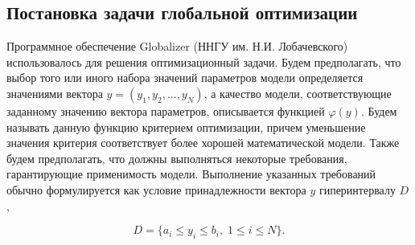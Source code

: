 \documentclass[mathematics,article,accept,pdftex,moreauthors]{Definitions/mdpi}
\begin{document}






\subsection{Постановка задачи глобальной оптимизации}
Программное обеспечение Globalizer (ННГУ им. Н.И. Лобачевского) использовалось для решения оптимизационный задачи.
Будем предполагать, что выбор того или иного набора значений параметров модели определяется значениями вектора $y=(y_1,y_2,...,y_N)$, а качество модели, соответствующие заданному значению вектора параметров, описывается функцией $\varphi(y)$. Будем называть данную функцию критерием оптимизации, причем уменьшение значения критерия соответствует более хорошей математической модели. Также будем предполагать, что должны выполняться некоторые требования, гарантирующие применимость модели. Выполнение указанных требований обычно формулируется как условие принадлежности вектора $y$ гиперинтервалу $D$,
\begin{linenomath}
\begin{equation}
D=\{a_i \leq y_i \leq b_i, \; 1 \leq i \leq N\}.
\end{equation}
\end{linenomath}
\end{document}

